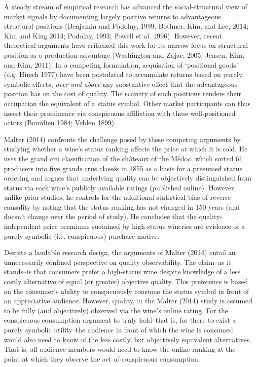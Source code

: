 A steady stream of empirical research has advanced the social-structural view of market signals by documenting largely positive returns to advantageous structural positions (Benjamin and Podolny, 1999; Bothner, Kim, and Lee, 2014; Kim and King 2014; Podolny, 1993; Powell et al. 1996). However, recent theoretical arguments have criticized this work for its narrow focus on structural position as a production advantage (Washington and Zajac, 2005; Jensen, Kim, and Kim, 2011). In a competing formulation, acquisition of `positional goods' (e.g. Hirsch 1977) have been postulated to accumulate returns based on purely symbolic effects, {\it over and above} any substantive effect that the advantageous position has on the cost of quality. The scarcity of such positions renders their occupation the equivalent of a status symbol. Other market participants can thus assert their prominence via conspicuous affiliation with these well-positioned actors (Bourdieu 1984; Veblen 1899). 

Malter (2014) confronts the challenge posed by these competing arguments by studying whether a wine's status ranking affects the price at which it is sold. He uses the grand cru classification of the ch\^ateaux of the M\'edoc, which sorted 61 producers into five grands crus class\'es in 1855 as a basis for a presumed status ordering and argues that underlying quality can be objectively distinguished from status via each wine's publicly available ratings (published online). However, unlike prior studies, he controls for the additional statistical bias of reverse causality by noting that the status ranking has not changed in 150 years (and doesn't change over the period of study). He concludes that the quality-independent price premiums sustained by high-status wineries are evidence of a purely symbolic (i.e. conspicuous) purchase motive.

Despite a laudable research design, the arguments of Malter (2014) entail an unnecessarily confined perspective on quality observability. The claim--as it stands--is that consumers prefer a high-status wine despite knowledge of a less costly alternative of equal (or greater) objective quality. This preference is based on the consumer's ability to conspicuously consume the status symbol in front of an appreciative audience. However, quality, in the Malter (2014) study is assumed to be fully (and objectively) observed via the wine's online rating. For the conspicuous consumption argument to truly hold--that is, for there to exist a purely symbolic utility--the audience in front of which the wine is consumed would also need to know of the less costly, but objectively equivalent alternatives. That is, all audience members would need to know the online ranking at the point at which they observe the act of conspicuous consumption.

